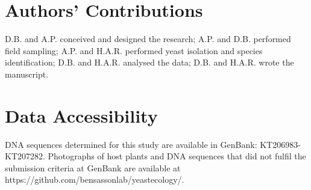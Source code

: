 \documentclass[12pt]{article}
\begin{document}

\section*{Authors' Contributions}
\label{Authors' Contributions}

D.B. and A.P. conceived and designed the research; A.P. and D.B. performed field sampling; A.P. and H.A.R. performed yeast isolation and species identification; D.B. and H.A.R. analysed the data; D.B. and H.A.R. wrote the manuscript.


\section*{Data Accessibility}
\label{Data Accessibility}

DNA sequences determined for this study are available in GenBank: KT206983-KT207282. Photographs of host plants and DNA sequences that did not fulfil the submission criteria at GenBank are available at https://github.com/bensassonlab/yeastecology/.


\end{document}
